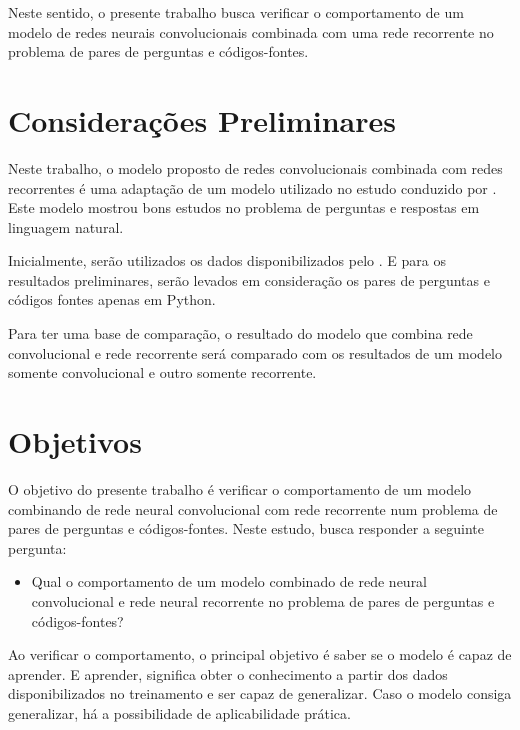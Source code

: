 Neste sentido, o presente trabalho busca verificar o comportamento de um modelo de redes neurais convolucionais combinada com uma rede recorrente no problema de pares de perguntas e códigos-fontes.


\section{Considerações Preliminares}
\label{sec:consideracoes_preliminares}

Neste trabalho, o modelo proposto de redes convolucionais combinada com redes recorrentes é uma adaptação de um modelo utilizado no estudo conduzido por \cite{feng-2015}. Este modelo mostrou bons estudos no problema de perguntas e respostas em linguagem natural. 

Inicialmente, serão utilizados os dados disponibilizados pelo \citeauthor{yao-2018}. E para os resultados preliminares, serão levados em consideração os pares de perguntas e códigos fontes apenas em Python. 

Para ter uma base de comparação, o resultado do modelo que combina rede convolucional e rede recorrente será comparado com os resultados de um modelo somente convolucional e outro somente recorrente.


\section{Objetivos}
\label{sec:objetivo}

O objetivo do presente trabalho é verificar o comportamento de um modelo combinando de rede neural convolucional com rede recorrente num problema de pares de perguntas e códigos-fontes. Neste estudo, busca responder a seguinte pergunta:

\begin{itemize}
    \item Qual o comportamento de um modelo combinado de rede neural convolucional e rede neural recorrente no problema de pares de perguntas e códigos-fontes? 
\end{itemize}

Ao verificar o comportamento, o principal objetivo é saber se o modelo é capaz de aprender. E aprender, significa obter o conhecimento a partir dos dados disponibilizados no treinamento e ser capaz de generalizar. Caso o modelo consiga generalizar, há a possibilidade de aplicabilidade prática.


